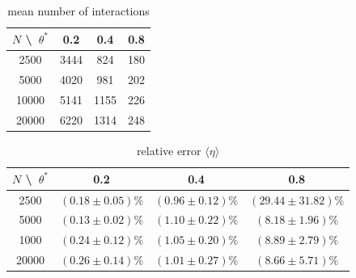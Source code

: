     \begin{table}[h!]
        \begin{center}
        \caption{mean number of interactions}
        \begin{tabular}{c | c | c | c}
            $N$ \textbackslash\ $\theta^*$ & 0.2  & 0.4  & 0.8 \\
            \hline
            2500  & 3444 & 824  & 180 \\
            \hline
            5000  & 4020 & 981  & 202 \\
            \hline
            10000 & 5141 & 1155 & 226 \\
            \hline
            20000 & 6220 & 1314 & 248 \\
        \end{tabular}
        \end{center}
    \end{table} 
    \begin{table}[h!]
        \begin{center}
            \caption{relative error $\langle\eta\rangle$}
            \begin{tabular}{c | c | c | c}
                $N$ \textbackslash\ $\theta^*$ & 0.2 & 0.4 & 0.8 \\
                \hline
                2500  & $(0.18\pm0.05)\%$ & $(0.96\pm0.12)\%$ & $(29.44\pm31.82)\%$ \\
                \hline
                5000  & $(0.13\pm0.02)\%$ & $(1.10\pm0.22)\%$ & $(8.18\pm1.96)\%$ \\
                \hline
                1000  & $(0.24\pm0.12)\%$ & $(1.05\pm0.20)\%$ & $(8.89\pm2.79)\%$ \\
                \hline
                20000 & $(0.26\pm0.14)\%$ & $(1.01\pm0.27)\%$ & $(8.66\pm5.71)\%$ \\
            \end{tabular}
        \end{center}
    \end{table} \ \\ 

\newpage
